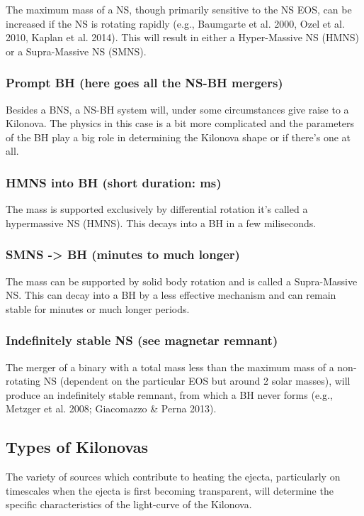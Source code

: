 The maximum mass of a NS, though primarily sensitive to the NS EOS, can be increased if the NS is rotating rapidly (e.g., Baumgarte et al. 2000, Ozel et al. 2010, Kaplan et al. 2014). This will result in either a Hyper-Massive NS (HMNS) or a Supra-Massive NS (SMNS).

\subsubsection{Prompt BH (here goes all the NS-BH mergers)}

Besides a BNS, a NS-BH system will, under some circumstances give raise to a Kilonova. The physics in this case is a bit more complicated and the parameters of the BH play a big role in determining the Kilonova shape or if there's one at all.

\subsubsection{HMNS into BH (short duration: ms)}

The mass is supported exclusively by differential rotation it's called a hypermassive NS (HMNS).
This decays into a BH in a few miliseconds.

\subsubsection{SMNS -> BH (minutes to much longer)}

The mass can be supported by solid body rotation and is called a Supra-Massive NS.
This can decay into a BH by a less effective mechanism and can remain stable for minutes or much longer periods.

\subsubsection{Indefinitely stable NS (see magnetar remnant)}

The merger of a binary with a total mass less than the maximum mass of a non-rotating NS (dependent on the particular EOS but around 2 solar masses), will produce an indefinitely stable remnant, from which a BH never forms (e.g., Metzger et al. 2008; Giacomazzo \& Perna 2013).

\subsection{Types of Kilonovas}

The variety of sources which contribute to heating the ejecta, particularly on timescales when the ejecta is first becoming transparent, 
will determine the specific characteristics of the light-curve of the Kilonova.

